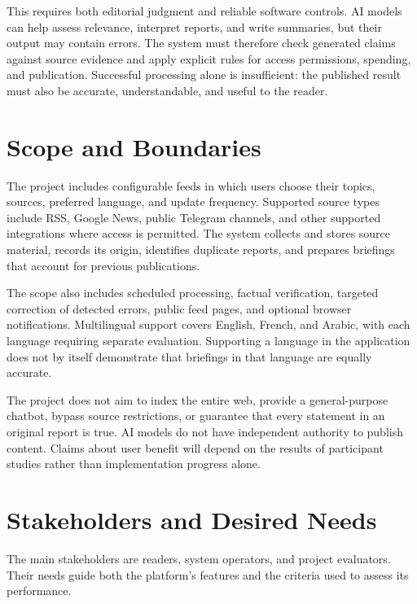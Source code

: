 This requires both editorial judgment and reliable software controls. AI models can help assess relevance, interpret reports, and write summaries, but their output may contain errors. The system must therefore check generated claims against source evidence and apply explicit rules for access permissions, spending, and publication. Successful processing alone is insufficient: the published result must also be accurate, understandable, and useful to the reader.

\section{Scope and Boundaries}

The project includes configurable feeds in which users choose their topics, sources, preferred language, and update frequency. Supported source types include RSS, Google News, public Telegram channels, and other supported integrations where access is permitted. The system collects and stores source material, records its origin, identifies duplicate reports, and prepares briefings that account for previous publications.

The scope also includes scheduled processing, factual verification, targeted correction of detected errors, public feed pages, and optional browser notifications. Multilingual support covers English, French, and Arabic, with each language requiring separate evaluation. Supporting a language in the application does not by itself demonstrate that briefings in that language are equally accurate.

The project does not aim to index the entire web, provide a general-purpose chatbot, bypass source restrictions, or guarantee that every statement in an original report is true. AI models do not have independent authority to publish content. Claims about user benefit will depend on the results of participant studies rather than implementation progress alone.

\section{Stakeholders and Desired Needs}

The main stakeholders are readers, system operators, and project evaluators. Their needs guide both the platform's features and the criteria used to assess its performance.

